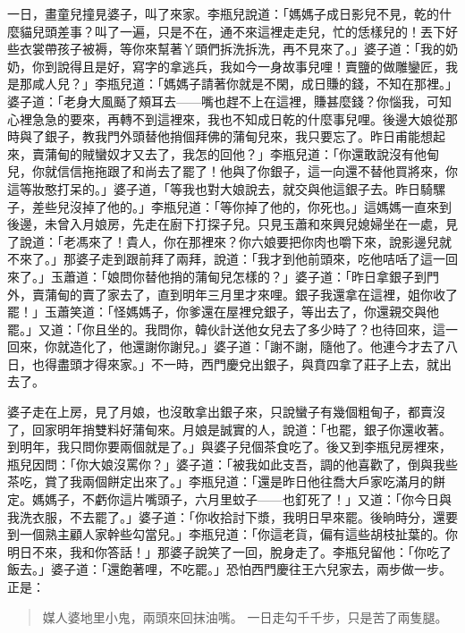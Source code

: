 一日，畫童兒撞見婆子，叫了來家。李瓶兒說道：「媽媽子成日影兒不見，乾的什麼貓兒頭差事？叫了一遍，只是不在，通不來這裡走走兒，忙的恁樣兒的！丟下好些衣裳帶孩子被褥，等你來幫著丫頭們拆洗拆洗，再不見來了。」婆子道：「我的奶奶，你到說得且是好，寫字的拿逃兵，我如今一身故事兒哩！賣鹽的做雕鑾匠，我是那咸人兒？」李瓶兒道：「媽媽子請著你就是不閑，成日賺的錢，不知在那裡。」婆子道：「老身大風颳了頰耳去——嘴也趕不上在這裡，賺甚麼錢？你惱我，可知心裡急急的要來，再轉不到這裡來，我也不知成日乾的什麼事兒哩。後邊大娘從那時與了銀子，教我門外頭替他捎個拜佛的蒲甸兒來，我只要忘了。昨日甫能想起來，賣蒲甸的賊蠻奴才又去了，我怎的回他？」李瓶兒道：「你還敢說沒有他甸兒，你就信信拖拖跟了和尚去了罷了！他與了你銀子，這一向還不替他買將來，你這等妝憨打呆的。」婆子道，「等我也對大娘說去，就交與他這銀子去。昨日騎騾子，差些兒沒掉了他的。」李瓶兒道：「等你掉了他的，你死也。」這媽媽一直來到後邊，未曾入月娘房，先走在廚下打探子兒。只見玉蕭和來興兒媳婦坐在一處，見了說道：「老馮來了！貴人，你在那裡來？你六娘要把你肉也嚼下來，說影邊兒就不來了。」那婆子走到跟前拜了兩拜，說道：「我才到他前頭來，吃他咭咶了這一回來了。」玉蕭道：「娘問你替他捎的蒲甸兒怎樣的？」婆子道：「昨日拿銀子到門外，賣蒲甸的賣了家去了，直到明年三月里才來哩。銀子我還拿在這裡，姐你收了罷！」玉蕭笑道：「怪媽媽子，你爹還在屋裡兌銀子，等出去了，你還親交與他罷。」又道：「你且坐的。我問你，韓伙計送他女兒去了多少時了？也待回來，這一回來，你就造化了，他還謝你謝兒。」婆子道：「謝不謝，隨他了。他連今才去了八日，也得盡頭才得來家。」不一時，西門慶兌出銀子，與賁四拿了莊子上去，就出去了。

婆子走在上房，見了月娘，也沒敢拿出銀子來，只說蠻子有幾個粗甸子，都賣沒了，回家明年捎雙料好蒲甸來。月娘是誠實的人，說道：「也罷，銀子你還收著。到明年，我只問你要兩個就是了。」與婆子兒個茶食吃了。後又到李瓶兒房裡來，瓶兒因問：「你大娘沒罵你？」婆子道：「被我如此支吾，調的他喜歡了，倒與我些茶吃，賞了我兩個餅定出來了。」李瓶兒道：「還是昨日他往喬大戶家吃滿月的餅定。媽媽子，不虧你這片嘴頭子，六月里蚊子——也釘死了！」又道：「你今日與我洗衣服，不去罷了。」婆子道：「你收拾討下漿，我明日早來罷。後晌時分，還要到一個熟主顧人家幹些勾當兒。」李瓶兒道：「你這老貨，偏有這些胡枝扯葉的。你明日不來，我和你答話！」那婆子說笑了一回，脫身走了。李瓶兒留他：「你吃了飯去。」婆子道：「還飽著哩，不吃罷。」恐怕西門慶往王六兒家去，兩步做一步。正是：
\begin{quote}
媒人婆地里小鬼，兩頭來回抹油嘴。
一日走勾千千步，只是苦了兩隻腿。
\end{quote}

